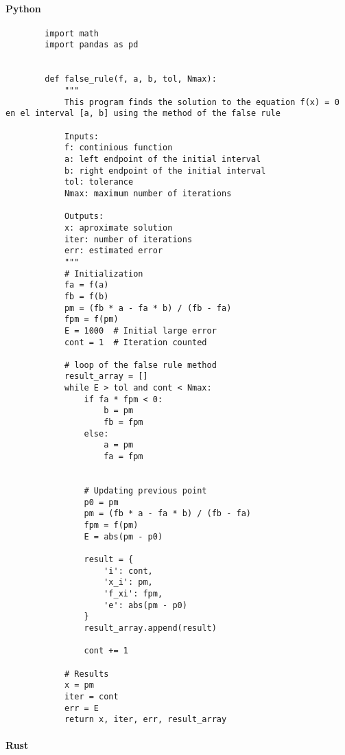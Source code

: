 \documentclass{article}
\begin{document}
    \paragraph{Python}
     \begin{verbatim}
        import math
        import pandas as pd


        def false_rule(f, a, b, tol, Nmax):
            """
            This program finds the solution to the equation f(x) = 0 en el interval [a, b] using the method of the false rule

            Inputs:
            f: continious function
            a: left endpoint of the initial interval
            b: right endpoint of the initial interval
            tol: tolerance
            Nmax: maximum number of iterations

            Outputs:
            x: aproximate solution
            iter: number of iterations
            err: estimated error
            """
            # Initialization
            fa = f(a)
            fb = f(b)
            pm = (fb * a - fa * b) / (fb - fa)
            fpm = f(pm)
            E = 1000  # Initial large error
            cont = 1  # Iteration counted

            # loop of the false rule method
            result_array = []
            while E > tol and cont < Nmax:
                if fa * fpm < 0:
                    b = pm
                    fb = fpm
                else:
                    a = pm
                    fa = fpm


                # Updating previous point
                p0 = pm
                pm = (fb * a - fa * b) / (fb - fa)
                fpm = f(pm)
                E = abs(pm - p0)

                result = {
                    'i': cont,
                    'x_i': pm,
                    'f_xi': fpm,
                    'e': abs(pm - p0)
                }
                result_array.append(result)

                cont += 1

            # Results
            x = pm
            iter = cont
            err = E
            return x, iter, err, result_array

    \end{verbatim}

    \paragraph{Rust}
\end{document}
